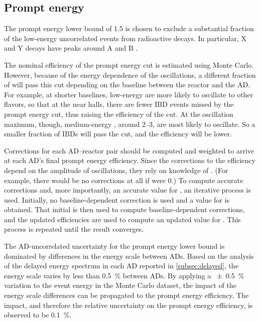 \subsection{Prompt energy}
The prompt energy lower bound of \SI{1.5}{\mev}
is chosen to exclude a substantial fraction
of the low-energy uncorrelated events from radioactive decays.
In particular, X and Y decays have peaks around A and B \si{\mev}.

The nominal efficiency of the prompt energy cut is estimated using Monte Carlo.
However, because of the energy dependence of the \nuebar{} oscillations,
a different fraction of \nuebar{} will pass this cut
depending on the baseline between the reactor and the AD.
For example, at shorter baselines, low-energy \nuebar{}
are more likely to oscillate to other flavors, so that at the near halls,
there are fewer IBD events missed by the prompt energy cut,
thus raising the efficiency of the cut.
At the oscillation maximum, though, medium-energy \nuebar{},
around \SIrange{2}{3}{\mev}, are most likely to oscillate.
So a smaller fraction of IBDs will pass the cut,
and the efficiency will be lower.

Corrections for each AD--reactor pair should be computed
and weighted to arrive at each AD's final prompt energy efficiency.
Since the corrections to the efficiency depend on
the amplitude of \nuebar{} oscillations, they rely on knowledge of \thetaot.
(For example, there would be no corrections at all if \thetaot{} were $0$.)
To compute accurate corrections and, more importantly, an accurate value
for \thetaot{}, an iterative process is used.
Initially, no baseline-dependent correction is used and
a value for \thetaot{} is obtained.
That initial \thetaot{} is then used to compute baseline-dependent corrections,
and the updated efficiencies are used to compute an updated value for \thetaot{}.
This process is repeated until the \thetaot{} result converges.

The AD-uncorrelated uncertainty for the prompt energy lower bound
is dominated by differences in the energy scale between ADs.
Based on the analysis of the delayed energy spectrum in each AD
reported in \cref{subsec:delayed}, the energy scale
varies by less than \SI{0.5}{\percent} between ADs.
By applying a \SI{+-0.5}{\percent} variation to
the event energy in the Monte Carlo dataset,
the impact of the energy scale differences can be propagated
to the prompt energy efficiency.
The impact, and therefore the relative uncertainty on
the prompt energy efficiency, is observed to be \SI{0.1}{\percent}.

